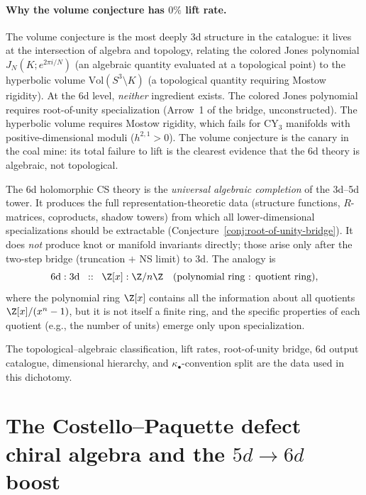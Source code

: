 \paragraph{Why the volume conjecture has \texorpdfstring{$0\%$}{0 percent} lift rate.}
The volume conjecture is the most deeply 3d structure in the catalogue: it lives at the intersection of algebra and topology, relating the colored Jones polynomial $J_N(K; e^{2\pi i/N})$ (an algebraic quantity evaluated at a topological point) to the hyperbolic volume $\mathrm{Vol}(S^3 \setminus K)$ (a topological quantity requiring Mostow rigidity). At the 6d level, \emph{neither} ingredient exists. The colored Jones polynomial requires root-of-unity specialization (Arrow~1 of the bridge, unconstructed). The hyperbolic volume requires Mostow rigidity, which fails for CY$_3$ manifolds with positive-dimensional moduli ($h^{2,1} > 0$). The volume conjecture is the canary in the coal mine: its total failure to lift is the clearest evidence that the 6d theory is algebraic, not topological.

\begin{remark}
\label{rem:correct-3d-6d-relationship}
The 6d holomorphic CS theory is the \emph{universal algebraic completion} of the 3d--5d tower. It produces the full representation-theoretic data (structure functions, $R$-matrices, coproducts, shadow towers) from which all lower-dimensional specializations should be extractable (Conjecture~\ref{conj:root-of-unity-bridge}). It does \emph{not} produce knot or manifold invariants directly; those arise only after the two-step bridge (truncation $+$ NS limit) to 3d. The analogy is
\[
 \text{6d} : \text{3d} \;\;::\;\; \Z[x] : \Z/n\Z
 \quad\text{(polynomial ring : quotient ring)},
\]
where the polynomial ring $\Z[x]$ contains all the information about all quotients $\Z[x]/(x^n - 1)$, but it is not itself a finite ring, and the specific properties of each quotient (e.g., the number of units) emerge only upon specialization.
\end{remark}

\noindent The topological--algebraic classification, lift rates,
root-of-unity bridge, 6d output catalogue, dimensional hierarchy, and
\(\kappa_\bullet\)-convention split are the data used in this dichotomy.


\section{The Costello--Paquette defect chiral algebra and the \texorpdfstring{$5d \to 6d$}{5d -> 6d} boost}
\label{sec:costello-paquette-defect}

